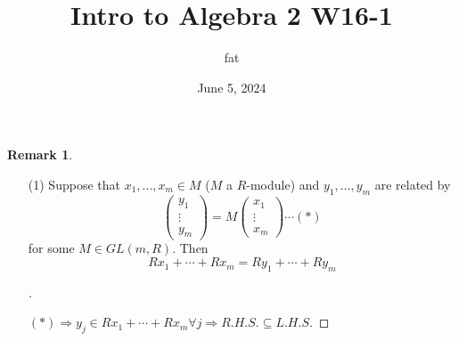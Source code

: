 \documentclass{article}
\title{Intro to Algebra 2 W16-1}
\author{fat}
\date{June 5, 2024}
\theoremstyle{definition}
\newtheorem{rem}{Remark}
\newenvironment{proofs}[1][\proofname]{%
  \begin{proof}[#1]$ $\par\nobreak\ignorespaces
}{%
  \end{proof}
}
\newcommand{\Ra}{\Rightarrow}
\begin{document}
\maketitle
\thispagestyle{fancy}
\renewcommand{\footrulewidth}{0.4pt}
\cfoot{\thepage}
\renewcommand{\headrulewidth}{0.4pt}

\begin{rem}
	\begin{enumerate}
		\item[(1)] Suppose that $x_1, ..., x_m \in M$ ($M$ a $R$-module) and $y_1, ..., y_m$ are related by
			\[
				\begin{pmatrix}
					y_1\\
					\vdots\\
					y_m
				\end{pmatrix}
				= M
				\begin{pmatrix}
					x_1\\
					\vdots\\
					x_m
				\end{pmatrix}
				\cdots (*)
			\]
			for some $M \in GL(m, R)$.
			Then
			\[
				R x_1 + \cdots + R x_m = R y_1 + \cdots + R y_m
			\]

			\begin{proofs}
				$(*) \Ra y_j \in R x_1 + \cdots + R x_m \forall j \Ra R.H.S. \subseteq L.H.S$.
				

\end{proofs}
\end{enumerate}
\end{rem}
\end{document}
